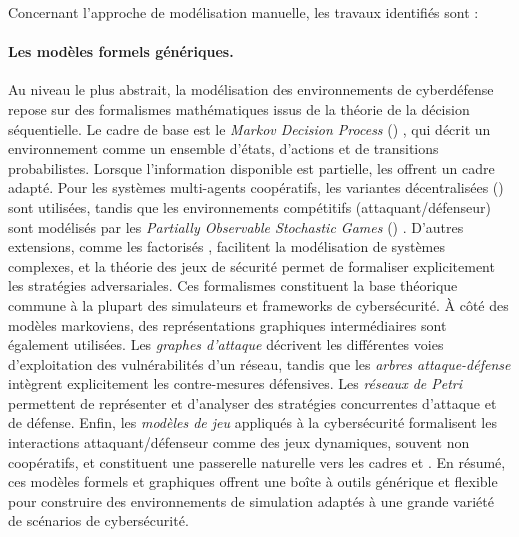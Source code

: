 Concernant l'approche de modélisation manuelle, les travaux identifiés sont :

\paragraph{Les modèles formels génériques.}
Au niveau le plus abstrait, la modélisation des environnements de cyberdéfense repose sur des formalismes mathématiques issus de la théorie de la décision séquentielle. Le cadre de base est le \textit{Markov Decision Process} () \cite{puterman1994mdp}, qui décrit un environnement comme un ensemble d’états, d’actions et de transitions probabilistes. Lorsque l’information disponible est partielle, les  \cite{kaelbling1998pomdp} offrent un cadre adapté. Pour les systèmes multi-agents coopératifs, les variantes décentralisées () \cite{Oliehoek2016} sont utilisées, tandis que les environnements compétitifs (attaquant/défenseur) sont modélisés par les \textit{Partially Observable Stochastic Games} () \cite{hansen2004posg}. D’autres extensions, comme les  factorisés \cite{guestrin2003factored}, facilitent la modélisation de systèmes complexes, et la théorie des jeux de sécurité \cite{manshaei2013game} permet de formaliser explicitement les stratégies adversariales.
Ces formalismes constituent la base théorique commune à la plupart des simulateurs et frameworks de cybersécurité. À côté des modèles markoviens, des représentations graphiques intermédiaires sont également utilisées. Les \textit{graphes d’attaque} \cite{CPhilips1998} décrivent les différentes voies d’exploitation des vulnérabilités d’un réseau, tandis que les \textit{arbres attaque-défense} \cite{BKordy2010} intègrent explicitement les contre-mesures défensives. Les \textit{réseaux de Petri} \cite{MPetty2022,JBland2020,SYamaguchi2020} permettent de représenter et d’analyser des stratégies concurrentes d’attaque et de défense. Enfin, les \textit{modèles de jeu} appliqués à la cybersécurité \cite{MPanfili2018,AAttiah2018,CXiaolin2008} formalisent les interactions attaquant/défenseur comme des jeux dynamiques, souvent non coopératifs, et constituent une passerelle naturelle vers les cadres  et  \cite{beynier2010,terry2020pettingzoo,bernstein2013}.
En résumé, ces modèles formels et graphiques offrent une boîte à outils générique et flexible pour construire des environnements de simulation adaptés à une grande variété de scénarios de cybersécurité.


